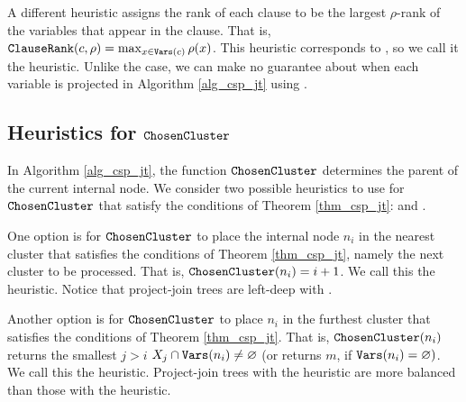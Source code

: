 A different heuristic assigns the rank of each clause to be the largest $\rho$-rank of the variables that appear in the clause.
That is, $\texttt{\upshape ClauseRank}(c, \rho) = \max_{x \in \texttt{\upshape Vars}(c)} \rho(x)$.
This heuristic corresponds to  \cite{bouquet1999gestion}, so we call it the \Bm{} heuristic.
Unlike the \Be{} case, we can make no guarantee about when each variable is projected in Algorithm \ref{alg_csp_jt} using \Bm{}.


\subsection{Heuristics for \texorpdfstring{$\texttt{\upshape ChosenCluster}$}{ChosenCluster}}

In Algorithm \ref{alg_csp_jt}, the function $\texttt{\upshape ChosenCluster}$ determines the parent of the current internal node.
We consider two possible heuristics to use for $\texttt{\upshape ChosenCluster}$ that satisfy the conditions of Theorem \ref{thm_csp_jt}:  and  \cite{dudek2020addmc}.

One option is for $\texttt{\upshape ChosenCluster}$ to place the internal node $n_i$ in the nearest cluster that satisfies the conditions of Theorem \ref{thm_csp_jt}, namely the next cluster to be processed.
That is, $\texttt{\upshape ChosenCluster}(n_i) = i + 1$.
We call this the  heuristic.
Notice that project-join trees are left-deep with \ListH{}.

Another option is for $\texttt{\upshape ChosenCluster}$ to place $n_i$ in the furthest cluster that satisfies the conditions of Theorem \ref{thm_csp_jt}.
That is, $\texttt{\upshape ChosenCluster}(n_i)$ returns the smallest $j > i$ \st{} $X_j \cap \texttt{\upshape Vars}(n_i) \ne \varnothing$ (or returns $m$, if $\texttt{\upshape Vars}(n_i) = \varnothing)$.
We call this the  heuristic.
Project-join trees with the \TreeH{} heuristic are more balanced than those with the \ListH{} heuristic.
